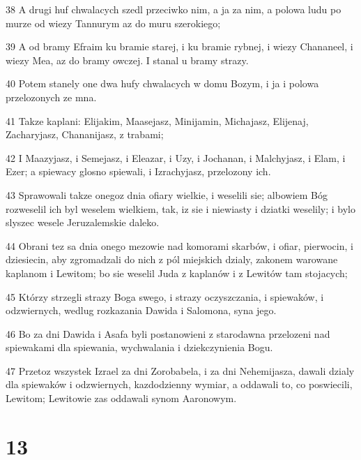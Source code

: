 \par 38 A drugi huf chwalacych szedl przeciwko nim, a ja za nim, a polowa ludu po murze od wiezy Tannurym az do muru szerokiego;
\par 39 A od bramy Efraim ku bramie starej, i ku bramie rybnej, i wiezy Chananeel, i wiezy Mea, az do bramy owczej. I stanal u bramy strazy.
\par 40 Potem stanely one dwa hufy chwalacych w domu Bozym, i ja i polowa przelozonych ze mna.
\par 41 Takze kaplani: Elijakim, Maasejasz, Minijamin, Michajasz, Elijenaj, Zacharyjasz, Chananijasz, z trabami;
\par 42 I Maazyjasz, i Semejasz, i Eleazar, i Uzy, i Jochanan, i Malchyjasz, i Elam, i Ezer; a spiewacy glosno spiewali, i Izrachyjasz, przelozony ich.
\par 43 Sprawowali takze onegoz dnia ofiary wielkie, i weselili sie; albowiem Bóg rozweselil ich byl weselem wielkiem, tak, iz sie i niewiasty i dziatki weselily; i bylo slyszec wesele Jeruzalemskie daleko.
\par 44 Obrani tez sa dnia onego mezowie nad komorami skarbów, i ofiar, pierwocin, i dziesiecin, aby zgromadzali do nich z pól miejskich dzialy, zakonem warowane kaplanom i Lewitom; bo sie weselil Juda z kaplanów i z Lewitów tam stojacych;
\par 45 Którzy strzegli strazy Boga swego, i strazy oczyszczania, i spiewaków, i odzwiernych, wedlug rozkazania Dawida i Salomona, syna jego.
\par 46 Bo za dni Dawida i Asafa byli postanowieni z starodawna przelozeni nad spiewakami dla spiewania, wychwalania i dziekczynienia Bogu.
\par 47 Przetoz wszystek Izrael za dni Zorobabela, i za dni Nehemijasza, dawali dzialy dla spiewaków i odzwiernych, kazdodzienny wymiar, a oddawali to, co poswiecili, Lewitom; Lewitowie zas oddawali synom Aaronowym.

\chapter{13}

